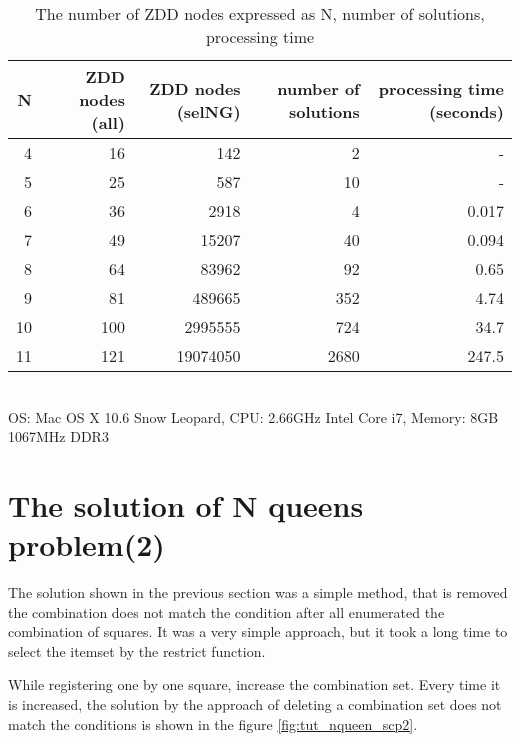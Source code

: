 \begin{table}
\begin{center}
\caption{The number of ZDD nodes expressed as N, number of solutions, processing time\label{tbl:tut_nqueen_result}}
\begin{tabular}{r|r|r|r|r}
\hline
N & ZDD nodes (all) & ZDD nodes (selNG) & number of solutions & processing time (seconds) \\
\hline
4 &  16 &      142 &    2 & - \\
5 &  25 &      587 &   10 & - \\
6 &  36 &     2918 &    4 & 0.017 \\
7 &  49 &    15207 &   40 & 0.094 \\
8 &  64 &    83962 &   92 & 0.65 \\
9 &  81 &   489665 &  352 & 4.74 \\
10& 100 &  2995555 &  724 & 34.7 \\
11& 121 & 19074050 & 2680 & 247.5 \\
\hline
\end{tabular}
\\
{\scriptsize *OS: Mac OS X 10.6 Snow Leopard, CPU: 2.66GHz Intel Core i7, Memory: 8GB 1067MHz DDR3}\\
\end{center}
\end{table}

\section{The solution of N queens problem(2)}
The solution shown in the previous section was a simple method, that is removed the combination does not match the condition after all enumerated the combination of squares. It was a very simple approach, but it took a long time to select the itemset by the restrict function.

While registering one by one square, increase the combination set. Every time it is increased, the solution by the approach of deleting a combination set  does not match the conditions is shown in the figure \ref{fig:tut_nqueen_scp2}.


